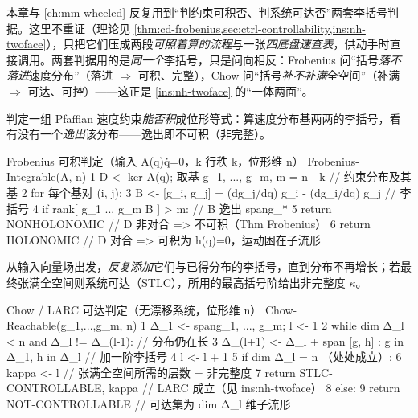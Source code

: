 本章与 \cref{ch:mm-wheeled} 反复用到“判约束可积否、判系统可达否”两套李括号判据。这里不重证（理论见 \cref{thm:cd-frobenius,sec:ctrl-controllability,ins:nh-twoface}），只把它们压成两段\emph{可照着算的流程}与一张\emph{四底盘速查表}，供动手时直接调用。两套判据用的是\emph{同一个}李括号，只是问向相反：Frobenius 问“括号\emph{落不落进}速度分布”（落进 $\Rightarrow$ 可积、完整），Chow 问“括号\emph{补不补满}全空间”（补满 $\Rightarrow$ 可达、可控）——这正是 \cref{ins:nh-twoface} 的“一体两面”。

\begin{algo}\label{alg:nh-frobenius}
判定一组 Pfaffian 速度约束\emph{能否积}成位形等式：算速度分布基两两的李括号，看有没有一个\emph{逸出}该分布——逸出即不可积（非完整）。
\end{algo}
\begin{codebox}[text]{Frobenius 可积判定（输入 A(q)q̇=0，k 行秩 k，位形维 n）}
Frobenius-Integrable(A, n)
 1  D <- ker A(q);  取基 {g_1, ..., g_m},  m = n - k     // 约束分布及其基
 2  for 每个基对 (i, j):
 3      B <- [g_i, g_j] = (dg_j/dq) g_i - (dg_i/dq) g_j  // 李括号
 4      if rank[ g_1 ... g_m  B ] > m:                    // B 逸出 span{g_*}
 5          return NONHOLONOMIC      // D 非对合 => 不可积（Thm Frobenius）
 6  return HOLONOMIC                 // D 对合 => 可积为 h(q)=0，运动困在子流形
\end{codebox}

\begin{algo}\label{alg:nh-chow}
从输入向量场出发，\emph{反复添加}它们与已得分布的李括号，直到分布不再增长；若最终张满全空间则系统可达（STLC），所用的最高括号阶给出非完整度 $\kappa$。
\end{algo}
\begin{codebox}[text]{Chow / LARC 可达判定（无漂移系统，位形维 n）}
Chow-Reachable({g_1,...,g_m}, n)
 1  Δ_1 <- span{g_1, ..., g_m};   l <- 1
 2  while dim Δ_l < n  and  Δ_l != Δ_(l-1):              // 分布仍在长
 3      Δ_(l+1) <- Δ_l + span{ [g, h] : g  in  Δ_1, h  in  Δ_l }   // 加一阶李括号
 4      l <- l + 1
 5  if dim Δ_l = n （处处成立）:
 6      kappa <- l                       // 张满全空间所需的层数 = 非完整度
 7      return STLC-CONTROLLABLE, kappa  // LARC 成立（见 ins:nh-twoface）
 8  else:
 9      return NOT-CONTROLLABLE      // 可达集为 dim Δ_l 维子流形
\end{codebox}

